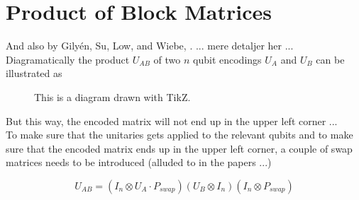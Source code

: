 \documentclass[11pt]{article}
\begin{document}
%
%

\section*{Product of Block Matrices}

And also by Gily\'{e}n, Su,  Low, and Wiebe,  \cite{GSLW2019}.  ... mere detaljer her ...\\

Diagramatically the product $U_{AB}$ of two $n$ qubit encodings $U_A$ and $U_B$ can be illustrated as

\begin{figure}[H]
\begin{center}
    \caption{This is a diagram drawn with TikZ.}
    \label{fig:tikz_example} %
\end{center}
\end{figure}

But this way, the encoded matrix will not end up in the upper left corner ...\\

To make sure that the unitaries gets applied to the relevant qubits and to make sure that the encoded matrix ends up in the upper left corner, a couple of swap matrices needs to be introduced (alluded to in the papers ...)

\begin{equation*}
   U_{AB} = (I_n  \otimes  U_A \cdot P_{swap})   (U_B \otimes I_n) (I_n \otimes P_{swap})
\end{equation*}
\end{document}
